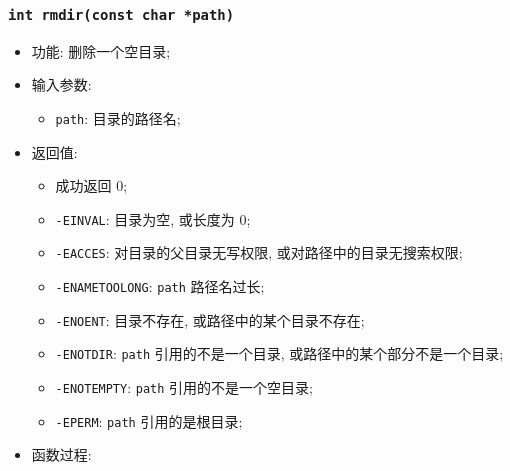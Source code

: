 \documentclass[nofonts, titlepage]{ctexart}
\begin{document}
  \subsubsection[\texttt{rmdir}]{\texttt{int rmdir(const char *path)}}
  \begin{itemize}
\item
  功能: 删除一个空目录;
\item
  输入参数:

  \begin{itemize}
  \item
    \texttt{path}: 目录的路径名;
  \end{itemize}
\item
  返回值:

  \begin{itemize}
  \item
    成功返回 0;
  \item
    \texttt{-EINVAL}: 目录为空, 或长度为 0;
  \item
    \texttt{-EACCES}: 对目录的父目录无写权限,
    或对路径中的目录无搜索权限;
  \item
    \texttt{-ENAMETOOLONG}: \texttt{path} 路径名过长;
  \item
    \texttt{-ENOENT}: 目录不存在, 或路径中的某个目录不存在;
  \item
    \texttt{-ENOTDIR}: \texttt{path} 引用的不是一个目录,
    或路径中的某个部分不是一个目录;
  \item
    \texttt{-ENOTEMPTY}: \texttt{path} 引用的不是一个空目录;
  \item
    \texttt{-EPERM}: \texttt{path} 引用的是根目录;
  \end{itemize}
\item
  函数过程:


\end{itemize}
\end{document}

